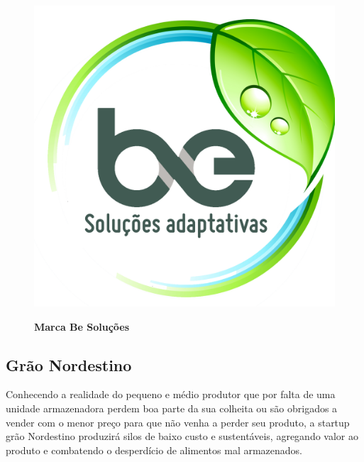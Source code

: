 \begin{figure}[H]
\centering
\caption{\textbf{Marca Be Soluções}}
\includegraphics[scale=0.5]{Imagens/besolucoes.png}
\label{figura_20}
\end{figure}

\subsection{Grão Nordestino}

Conhecendo a realidade do pequeno e médio produtor que por falta de uma unidade armazenadora perdem boa parte da sua colheita ou são obrigados a vender com o menor preço para que não venha a perder seu produto, a startup grão Nordestino produzirá silos de baixo custo e sustentáveis, agregando valor ao produto e combatendo o desperdício de alimentos mal armazenados.


